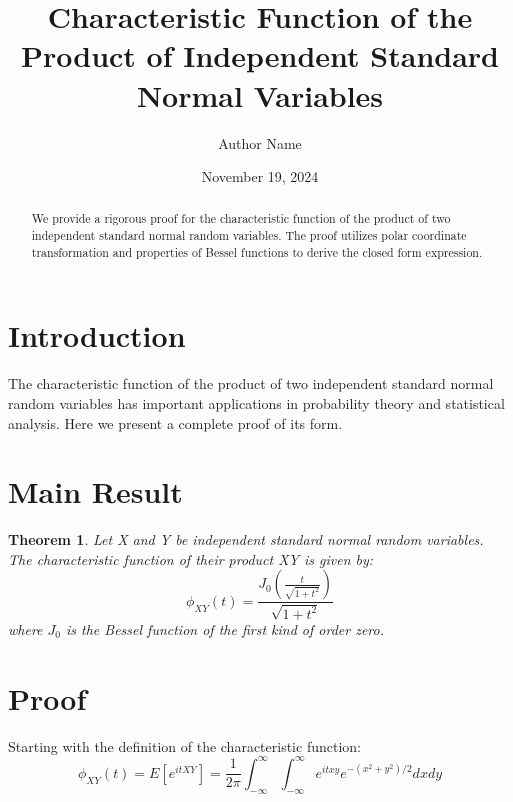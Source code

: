 \documentclass{article}
\newtheorem{theorem}{Theorem}
\begin{document}
\title{Characteristic Function of the Product of Independent Standard Normal
Variables}

\author{Author Name}

\date{November 19, 2024}

\maketitle

\begin{abstract}
  We provide a rigorous proof for the characteristic function of the product
  of two independent standard normal random variables. The proof utilizes
  polar coordinate transformation and properties of Bessel functions to derive
  the closed form expression.
\end{abstract}

\section{Introduction}

The characteristic function of the product of two independent standard normal
random variables has important applications in probability theory and
statistical analysis. Here we present a complete proof of its form.

\section{Main Result}

\begin{theorem}
  Let X and Y be independent standard normal random variables. The
  characteristic function of their product XY is given by:
  \begin{equation}
    \phi_{XY} (t) = \frac{J_0 \left( \frac{t}{\sqrt{1 + t^2}} \right)}{\sqrt{1
    + t^2}} 
  \end{equation}
  where $J_0$ is the Bessel function of the first kind of order zero.
\end{theorem}

\section{Proof}

Starting with the definition of the characteristic function:
\begin{equation}
  \phi_{XY} (t) = E [e^{itXY}] = \frac{1}{2 \pi}  \int_{- \infty}^{\infty}
  \int_{- \infty}^{\infty} e^{itxy} e^{- (x^2 + y^2) / 2} dxdy
\end{equation}
\end{document}

